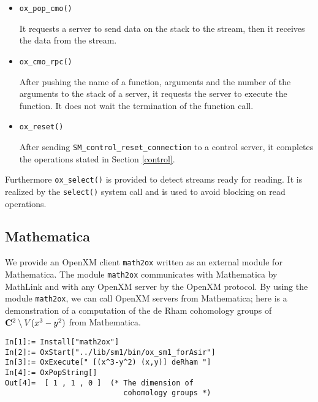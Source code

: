 \begin{itemize}
\item {\tt ox\_pop\_cmo()}

It requests a server to send data on the stack to the stream, then
it receives the data from the stream.

\item {\tt ox\_cmo\_rpc()}

After pushing the name of a function, arguments and the number of the
arguments to the stack of a server, it requests the server to execute
the function. It does not wait the termination of the function call.

\item {\tt ox\_reset()}

After sending {\tt SM\_control\_reset\_connection} to a control server,
it completes the operations stated in Section \ref{control}.
\end{itemize}
Furthermore {\tt ox\_select()} is provided to detect streams ready for
reading. It is realized by the {\tt select()} system call and is used
to avoid blocking on read operations.

\subsection{Mathematica}

We provide an OpenXM client {\tt math2ox} written as an external module
for Mathematica.  
The module {\tt math2ox} communicates with Mathematica by MathLink and
with any OpenXM server by the OpenXM protocol.  
By using the module {\tt math2ox},
we can call OpenXM servers from Mathematica;
here is a demonstration of a computation of the de Rham cohomology groups
of ${\bf C}^2 \setminus V(x^3-y^2)$ from Mathematica.
{\footnotesize
\begin{verbatim}
In[1]:= Install["math2ox"]
In[2]:= OxStart["../lib/sm1/bin/ox_sm1_forAsir"]
In[3]:= OxExecute[" [(x^3-y^2) (x,y)] deRham "]
In[4]:= OxPopString[]
Out[4]=  [ 1 , 1 , 0 ]  (* The dimension of 
                           cohomology groups *)
\end{verbatim}
}


